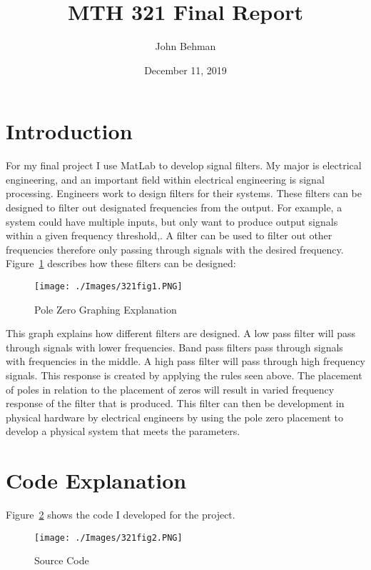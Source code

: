 \documentclass[a4paper]{article}
\title{MTH 321 Final Report}
\author{John Behman}
\date{December 11, 2019}
\begin{document}
\maketitle


\section{Introduction}

For my final project I use MatLab \cite{MatL} to develop signal filters. My major is electrical engineering, and an important field within electrical engineering is signal processing. Engineers work to design filters for their systems. These filters can be designed to filter out designated frequencies from the output. For example, a system could have multiple inputs, but only want to produce output signals within a given frequency threshold,. A filter can be used to filter out other frequencies therefore only passing through signals with the desired frequency. \newline \newline Figure~\ref{fig:1} describes how these filters can be designed: \newline
  \begin{figure}[h]
    \centering
    \texttt{[image: ./Images/321fig1.PNG]}
    \caption{Pole Zero Graphing Explanation \cite{EarLevel}}
    \label{fig:1}
  \end{figure}

This graph explains how different filters are designed. A low pass filter will pass through signals with lower frequencies. Band pass filters pass through signals with frequencies in the middle. A high pass filter will pass through high frequency signals. This response is created by applying the rules seen above. The placement of poles in relation to the placement of zeros will result in varied frequency response of the filter that is produced. This filter can then be development in physical hardware by electrical engineers by using the pole zero placement to develop a physical system that meets the parameters.

\section{Code Explanation}
Figure~\ref{fig:2} shows the code I developed for the project.
  \begin{figure}[h]
    \centering
    \texttt{[image: ./Images/321fig2.PNG]}
    \caption{Source Code}
    \label{fig:2}
  \end{figure}
\end{document}
